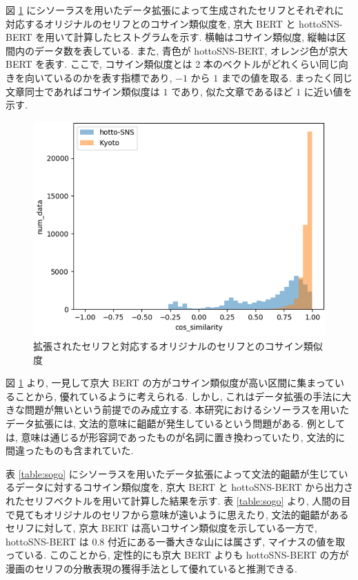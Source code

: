 図 \ref{fig:cos_bert} にシソーラスを用いたデータ拡張によって生成されたセリフとそれぞれに対応するオリジナルのセリフとのコサイン類似度を, 京大 BERT と hottoSNS-BERT を用いて計算したヒストグラムを示す. 横軸はコサイン類似度, 縦軸は区間内のデータ数を表している. また, 青色が hottoSNS-BERT, オレンジ色が京大 BERT を表す. ここで, コサイン類似度とは 2 本のベクトルがどれくらい同じ向きを向いているのかを表す指標であり, $-1$ から $1$ までの値を取る. まったく同じ文章同士であればコサイン類似度は $1$ であり, 似た文章であるほど $1$ に近い値を示す.

\begin{figure}[!h]
  \centering
  \includegraphics[width=0.8\hsize]{doc/figures/cos_bert.png}
  \caption{拡張されたセリフと対応するオリジナルのセリフとのコサイン類似度}
  \label{fig:cos_bert}
\end{figure}

\newpage
図 \ref{fig:cos_bert} より, 一見して京大 BERT の方がコサイン類似度が高い区間に集まっていることから, 優れているように考えられる. しかし, これはデータ拡張の手法に大きな問題が無いという前提でのみ成立する. 本研究におけるシソーラスを用いたデータ拡張には, 文法的意味に齟齬が発生しているという問題がある. 例としては, 意味は通じるが形容詞であったものが名詞に置き換わっていたり, 文法的に間違ったものも含まれていた.

表 \ref{table:sogo} にシソーラスを用いたデータ拡張によって文法的齟齬が生じているデータに対するコサイン類似度を, 京大 BERT と hottoSNS-BERT から出力されたセリフベクトルを用いて計算した結果を示す. 表 \ref{table:sogo} より, 人間の目で見てもオリジナルのセリフから意味が遠いように思えたり, 文法的齟齬があるセリフに対して, 京大 BERT は高いコサイン類似度を示している一方で, hottoSNS-BERT は $0.8$ 付近にある一番大きな山には属さず, マイナスの値を取っている. このことから, 定性的にも京大 BERT よりも hottoSNS-BERT の方が漫画のセリフの分散表現の獲得手法として優れていると推測できる.


